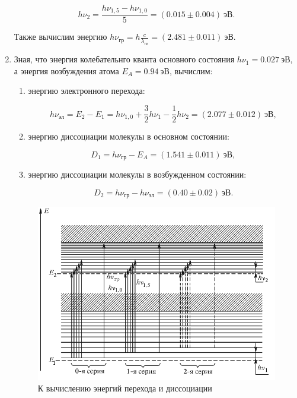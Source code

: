 \documentclass[14pt, a4paper]{report}
\begin{document}
\begin{enumerate}
\[h\nu_2=\frac{h\nu_{1,5}-h\nu_{1,0}}{5}=(0.015\pm0.004)\ эВ.\]

Также вычислим энергию $h\nu_{гр}=h\frac{c}{\lambda_{гр}}=(2.481\pm0.011)\ эВ$.

\item Зная, что энергия колебательнго кванта основного состояния $h\nu_1=0.027\ эВ$, а энергия возбуждения атома $E_A=0.94\ эВ$, вычислим:

\begin{enumerate}

\item энергию электронного перехода:

\[h\nu_{эл}=E_2-E_1=h\nu_{1,0}+\frac{3}{2}h\nu_{1}-\frac{1}{2}h\nu_{2}=(2.077\pm0.012)\ эВ,\]

\item энергию диссоциации молекулы в основном состоянии:

\[D_1=h\nu_{гр}-E_A=(1.541\pm0.011)\ эВ,\]

\item энергию диссоциации молекулы в возбужденном состоянии:

\[D_2=h\nu_{гр}-h\nu_{эл}=(0.40\pm0.02)\ эВ.\]

\end{enumerate}

\begin{figure}[H]
\centering
\includegraphics[scale=0.6]{../images/523-4}
\caption{К вычислению энергий перехода и диссоциации}
\end{figure}

\end{enumerate}
\end{document}
